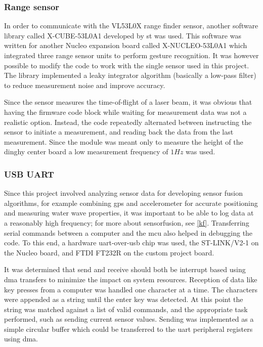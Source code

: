 \subsubsection{Range sensor}
In order to communicate with the VL53L0X range finder sensor, another software library called X-CUBE-53L0A1\cite{x-cube-53l0a} developed by \gls{st} was used. This software was written for another Nucleo expansion board called X-NUCLEO-53L0A1 which integrated three range sensor units to perform gesture recognition. It was however possible to modify the code to work with the single sensor used in this project. The library implemented a leaky integrator algorithm (basically a low-pass filter) to reduce measurement noise and improve accuracy.

Since the sensor measures the time-of-flight of a laser beam, it was obvious that having the firmware code block while waiting for measurement data was not a realistic option. Instead, the code repeatedly alternated between instructing the sensor to initiate a measurement, and reading back the data from the last measurement. Since the module was meant only to measure the height of the dinghy center board a low measurement frequency of $1Hz$ was used.


\subsubsection{USB UART}
\label{usb-uart}
Since this project involved analyzing sensor data for developing sensor fusion algorithms, for example combining \gls{gps} and accelerometer for accurate positioning and measuring water wave properties, it was important to be able to log data at a reasonably high frequency; for more about sensorfusion, see \autoref{kf}. Transferring serial commands between a computer and the \gls{mcu} also helped in debugging the code. To this end, a hardware \gls{uart}-over-\gls{usb} chip was used, the ST-LINK/V2-1 on the Nucleo board, and FTDI FT232R on the custom project board.

It was determined that send and receive should both be interrupt based using \gls{dma} transfers to minimize the impact on system resources. Reception of data like key presses from a computer was handled one character at a time. The characters were appended as a string until the enter key was detected. At this point the string was matched against a list of valid commands, and the appropriate task performed, such as sending current sensor values. Sending was implemented as a simple circular buffer which could be transferred to the \gls{uart} peripheral registers using \gls{dma}.

